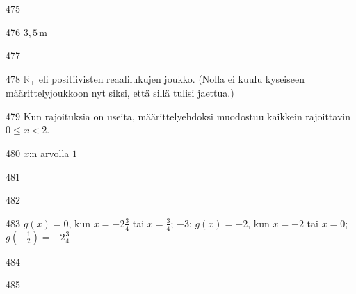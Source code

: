 \begin{Vastaus}{475}
	
\end{Vastaus}
\begin{Vastaus}{476}
	$3,5$\,m
	
\end{Vastaus}
\begin{Vastaus}{477}
	
\end{Vastaus}
\begin{Vastaus}{478}
	$\mathbb{R}_+$ eli positiivisten reaalilukujen joukko. (Nolla ei kuulu kyseiseen määrittelyjoukkoon nyt siksi, että sillä tulisi jaettua.)
	
\end{Vastaus}
\begin{Vastaus}{479}
	Kun rajoituksia on useita, määrittelyehdoksi muodostuu kaikkein rajoittavin $0\leq x<2$.
	
\end{Vastaus}
\begin{Vastaus}{480}
$x$:n arvolla $1$
	
\end{Vastaus}
\begin{Vastaus}{481}
  
\end{Vastaus}
\begin{Vastaus}{482}
	
\end{Vastaus}
\begin{Vastaus}{483}
	$g(x)=0$, kun $x=-2\frac{3}{4}$ tai $x=\frac{3}{4}$; $-3$; $g(x)=-2$, kun $x=-2$ tai $x=0$; $g\left(-\frac{1}{2}\right)=-2\frac{3}{4}$
	
\end{Vastaus}
\begin{Vastaus}{484}
	
\end{Vastaus}
\begin{Vastaus}{485}
	
\end{Vastaus}
